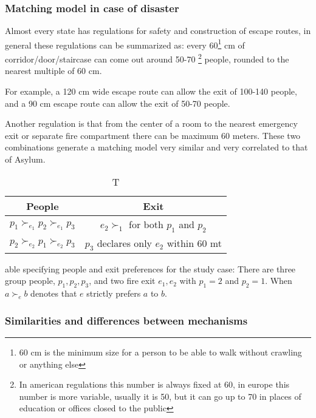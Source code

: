 \documentclass[letterpaper]{article} %
\begin{document}
\subsubsection{Matching model in case of disaster}

Almost every state has regulations for safety and construction of escape routes, in general these 
regulations can be summarized as: every 60\footnote{60 cm is the minimum size for a person to be 
able to walk without crawling or anything else} cm of corridor/door/staircase can come out around 50-70
\footnote{In american regulations this number is always fixed at 60, in europe this number is more 
variable, usually it is 50, but it can go up to 70 in places of education or offices closed to the public} 
people, rounded to the nearest multiple of 60 cm.

For example, a 120 cm wide escape route can allow the exit of 100-140 people, and a 90 cm 
escape route can allow the exit of 50-70 people.

Another regulation is that from the center of a room to the nearest emergency exit or separate 
fire compartment there can be maximum 60 meters. These two combinations generate a matching model 
very similar and very correlated to that of Asylum.

\cite{delacretaz}

\begin{table}[!htb]
    \begin{tabular}{c|c}
        \hline People & Exit \\
        \hline\( p_{1} \succ_{e_{1}} p_{2} \succ_{e_{1}} p_{3} \) & \( e_{2} \succ_{1} \) for both \( p_{1} \) and \( p_{2} \) \\
        \( p_{2} \succ_{e_{2}} p_{1} \succ_{e_{2}} p_{3} \) & \( p_{3} \) declares only \( e_{2} \) within 60 mt \\
        \hline
    \end{tabular}
    \caption Table specifying people and exit preferences for
    the study case: There are three group people, \( p _ { 1 } , p _ { 2 } , p _ { 3 } \), and two fire exit \( e _ { 1 } , e _ { 2 } \) with \( p _ { 1 } = 2 \) and \( p _ { 2 } = 1 \).
    When \( a \succ_{e} b \) denotes that \( e \) strictly prefers \( a \) to \( b \).
    \label{tab:people-exit}
\end{table}

\subsubsection{Similarities and differences between mechanisms}
\end{document}
